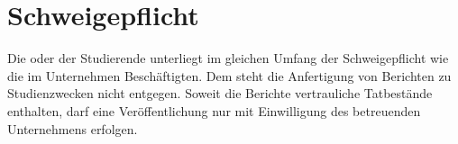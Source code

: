 \section{Schweigepflicht}

Die oder der Studierende unterliegt im gleichen Umfang der Schweigepflicht wie die im Unternehmen Beschäftigten. Dem steht die Anfertigung von Berichten zu Studienzwecken nicht entgegen. Soweit die Berichte vertrauliche Tatbestände enthalten, darf eine Veröffentlichung nur mit Einwilligung des betreuenden Unternehmens erfolgen.